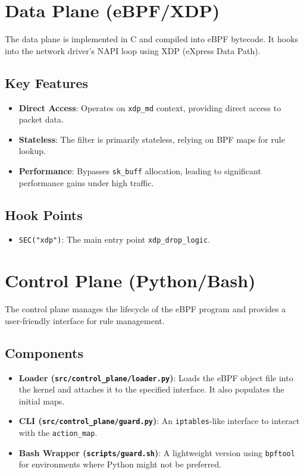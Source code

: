 \documentclass[11pt,a4paper]{report}
\begin{document}
\chapter{Data Plane (eBPF/XDP)}

The data plane is implemented in C and compiled into eBPF bytecode. It hooks into the network driver's NAPI loop using XDP (eXpress Data Path).

\section{Key Features}
\begin{itemize}
    \item \textbf{Direct Access}: Operates on \texttt{xdp\_md} context, providing direct access to packet data.
    \item \textbf{Stateless}: The filter is primarily stateless, relying on BPF maps for rule lookup.
    \item \textbf{Performance}: Bypasses \texttt{sk\_buff} allocation, leading to significant performance gains under high traffic.
\end{itemize}

\section{Hook Points}
\begin{itemize}
    \item \texttt{SEC("xdp")}: The main entry point \texttt{xdp\_drop\_logic}.
\end{itemize}

\chapter{Control Plane (Python/Bash)}

The control plane manages the lifecycle of the eBPF program and provides a user-friendly interface for rule management.

\section{Components}
\begin{itemize}
    \item \textbf{Loader (\texttt{src/control\_plane/loader.py})}: Loads the eBPF object file into the kernel and attaches it to the specified interface. It also populates the initial maps.
    \item \textbf{CLI (\texttt{src/control\_plane/guard.py})}: An \texttt{iptables}-like interface to interact with the \texttt{action\_map}.
    \item \textbf{Bash Wrapper (\texttt{scripts/guard.sh})}: A lightweight version using \texttt{bpftool} for environments where Python might not be preferred.
\end{itemize}
\end{document}
